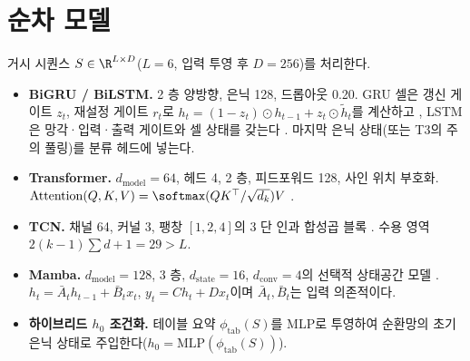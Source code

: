 
\section{순차 모델}
\label{sec:model-seq}

거시 시퀀스 $S \in \R^{L \times D}$($L=6$, 입력 투영 후 $D = 256$)를 처리한다.

\begin{itemize}[leftmargin=1.5em]
  \item \textbf{BiGRU / BiLSTM.} 2 층 양방향, 은닉 128, 드롭아웃 0.20. GRU 셀은 갱신 게이트 $z_t$, 재설정 게이트 $r_t$로 $h_t = (1-z_t)\odot h_{t-1} + z_t \odot \tilde h_t$를 계산하고 \cite{cho2014learning}, LSTM은 망각·입력·출력 게이트와 셀 상태를 갖는다 \cite{hochreiter1997long}. 마지막 은닉 상태(또는 T3의 주의 풀링)를 분류 헤드에 넣는다.
  \item \textbf{Transformer.} $d_{\mathrm{model}} = 64$, 헤드 4, 2 층, 피드포워드 128, 사인 위치 부호화. $\mathrm{Attention}(Q,K,V) = \softmax(QK^\top/\sqrt{d_k})V$ \cite{vaswani2017attention}.
  \item \textbf{TCN.} 채널 64, 커널 3, 팽창 $[1,2,4]$의 3 단 인과 합성곱 블록 \cite{bai2018empirical}. 수용 영역 $2(k-1)\sum d + 1 = 29 > L$.
  \item \textbf{Mamba.} $d_{\mathrm{model}} = 128$, 3 층, $d_{\mathrm{state}} = 16$, $d_{\mathrm{conv}} = 4$의 선택적 상태공간 모델 \cite{gu2023mamba}. $h_t = \bar A_t h_{t-1} + \bar B_t x_t$, $y_t = C h_t + D x_t$이며 $\bar A_t, \bar B_t$는 입력 의존적이다.
  \item \textbf{하이브리드 $h_0$ 조건화.} 테이블 요약 $\phi_{\mathrm{tab}}(S)$를 MLP로 투영하여 순환망의 초기 은닉 상태로 주입한다($h_0 = \mathrm{MLP}(\phi_{\mathrm{tab}}(S))$).
\end{itemize}

